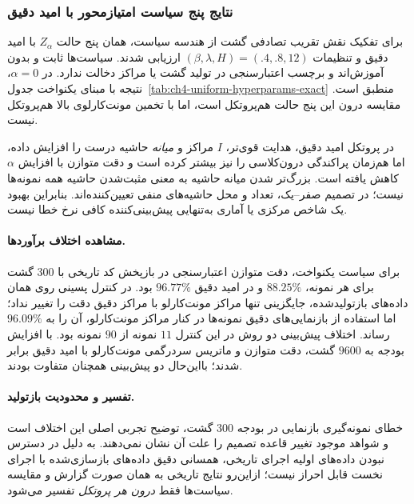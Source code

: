 \subsubsection{نتایج پنج سیاست امتیازمحور با امید دقیق}
\label{subsec:ch4-fixed-guided-exact}
برای تفکیک نقش تقریب تصادفی گشت از هندسه سیاست،
همان پنج حالت $Z_\alpha$ با امید دقیق 
و تنظیمات $(\beta,\lambda,H)=(.4,.8,12)$ ارزیابی شدند.
سیاست‌ها ثابت و بدون آموزش‌اند و برچسب اعتبارسنجی
در تولید گشت یا مراکز دخالت ندارد.
در $\alpha=0$، نتیجه با مبنای یکنواخت
جدول~\ref{tab:ch4-uniform-hyperparams-exact} منطبق است.
مقایسه درون این پنج حالت هم‌پروتکل است،
اما با تخمین مونت‌کارلوی بالا هم‌پروتکل نیست.



در پروتکل امید دقیق، هدایت قوی‌تر،
$I$ مراکز و \emph{میانه} حاشیه درست را افزایش داده،
اما هم‌زمان پراکندگی درون‌کلاسی را نیز بیشتر کرده است
و دقت متوازن با افزایش $\alpha$ کاهش یافته است.
بزرگ‌تر شدن میانه حاشیه به معنی مثبت‌شدن حاشیه
همه نمونه‌ها نیست؛ در تصمیم صفر--یک،
تعداد و محل حاشیه‌های منفی تعیین‌کننده‌اند.
بنابراین بهبود یک شاخص مرکزی یا آماری به‌تنهایی
پیش‌بینی‌کننده کافی نرخ خطا نیست.

\paragraph{مشاهده اختلاف برآوردها.}
برای سیاست یکنواخت، دقت متوازن اعتبارسنجی در
بازپخش کد تاریخی با $300$ گشت برای هر نمونه،
$88.25\%$ و در امید دقیق $96.77\%$ بود.
در کنترل پسینی روی همان داده‌های بازتولیدشده،
جایگزینی تنها مراکز مونت‌کارلو با مراکز دقیق
دقت را تغییر نداد؛ اما استفاده از بازنمایی‌های
دقیق نمونه‌ها در کنار مراکز مونت‌کارلو،
آن را به $96.09\%$ رساند. اختلاف پیش‌بینی
دو روش در این کنترل $11$ نمونه از $90$ نمونه بود.
با افزایش بودجه به $9600$ گشت، دقت متوازن
و ماتریس سردرگمی مونت‌کارلو با امید دقیق
برابر شدند؛ بااین‌حال دو پیش‌بینی همچنان
متفاوت بودند.

\paragraph{تفسیر و محدودیت بازتولید.}
خطای نمونه‌گیری بازنمایی در بودجه $300$ گشت،
توضیح تجربی اصلی این اختلاف است و شواهد موجود
تغییر قاعده تصمیم را علت آن نشان نمی‌دهند.
به دلیل در دسترس نبودن داده‌های اولیه اجرای تاریخی،
همسانی دقیق داده‌های بازسازی‌شده با اجرای نخست
قابل احراز نیست؛ ازاین‌رو نتایج تاریخی به همان صورت
گزارش و مقایسه سیاست‌ها فقط \emph{درون هر پروتکل}
تفسیر می‌شود.

